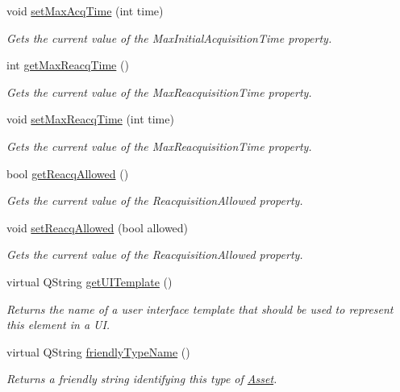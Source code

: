 \begin{DoxyCompactItemize}
void \hyperlink{class_picto_1_1_target_controller_a35612ec3ed6193745e0f893ec6d1e724}{set\-Max\-Acq\-Time} (int time)
\begin{DoxyCompactList}\small\item\em Gets the current value of the Max\-Initial\-Acquisition\-Time property. \end{DoxyCompactList}\item 
int \hyperlink{class_picto_1_1_target_controller_a1776df19b5a117422b53af54e7f70110}{get\-Max\-Reacq\-Time} ()
\begin{DoxyCompactList}\small\item\em Gets the current value of the Max\-Reacquisition\-Time property. \end{DoxyCompactList}\item 
void \hyperlink{class_picto_1_1_target_controller_a77f1a228b595658e2b22100e2b291658}{set\-Max\-Reacq\-Time} (int time)
\begin{DoxyCompactList}\small\item\em Gets the current value of the Max\-Reacquisition\-Time property. \end{DoxyCompactList}\item 
bool \hyperlink{class_picto_1_1_target_controller_a62561e1c967c26bf0b718fc469230685}{get\-Reacq\-Allowed} ()
\begin{DoxyCompactList}\small\item\em Gets the current value of the Reacquisition\-Allowed property. \end{DoxyCompactList}\item 
void \hyperlink{class_picto_1_1_target_controller_aacbe2fec4cd03f60c74b053266062861}{set\-Reacq\-Allowed} (bool allowed)
\begin{DoxyCompactList}\small\item\em Gets the current value of the Reacquisition\-Allowed property. \end{DoxyCompactList}\item 
\hypertarget{class_picto_1_1_target_controller_ae5ebefa9010cefd81276f84448d3cebb}{virtual Q\-String \hyperlink{class_picto_1_1_target_controller_ae5ebefa9010cefd81276f84448d3cebb}{get\-U\-I\-Template} ()}\label{class_picto_1_1_target_controller_ae5ebefa9010cefd81276f84448d3cebb}

\begin{DoxyCompactList}\small\item\em Returns the name of a user interface template that should be used to represent this element in a U\-I. \end{DoxyCompactList}\item 
virtual Q\-String \hyperlink{class_picto_1_1_target_controller_a41bdd3b670d2b5092ec5d68a44dc8ed6}{friendly\-Type\-Name} ()
\begin{DoxyCompactList}\small\item\em Returns a friendly string identifying this type of \hyperlink{class_picto_1_1_asset}{Asset}. \end{DoxyCompactList}\end{DoxyCompactItemize}
